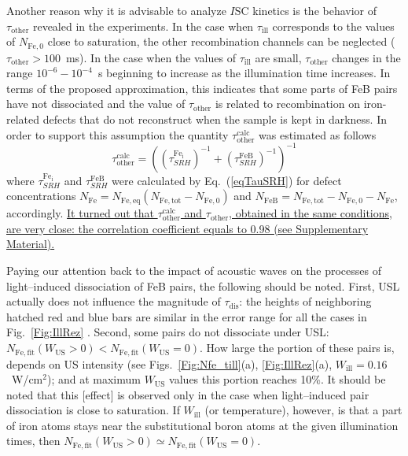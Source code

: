 \documentclass[%
 aip,jap,
 amsmath,amssymb,
 reprint,%
]{revtex4-1}
\begin{document}
Another reason why it is advisable to analyze $I\mathrm{SC}$ kinetics is the behavior of
$\tau_\mathrm{other}$ revealed in the experiments.
In the case when $\tau_\mathrm{ill}$ corresponds to the values of $N_\mathrm{Fe,0}$ close to saturation, the other recombination channels  can be neglected ($\tau_\mathrm{other}> 100$~ms).
In the case when the values of $\tau_\mathrm{ill}$ are small,
$\tau_\mathrm{other}$ changes in the range $10^{-6}-10^{-4}$~s beginning to increase as the illumination time increases.
In terms of the proposed approximation, this indicates that some parts of FeB pairs have not dissociated and the value of $\tau_\mathrm{other}$ is related
to recombination on iron-related defects that do not reconstruct when the sample is kept in darkness. In order to support this assumption the quantity
$\tau_\mathrm{other}^\mathrm{calc}$
was estimated as follows
\begin{equation*}
\tau_\mathrm{other}^\mathrm{calc}=\left(\left(\tau_{SRH}^\mathrm{Fe_i}\right)^{-1}
+\left(\tau_{SRH}^\mathrm{FeB}\right)^{-1}\right)^{-1}
\end{equation*}
where
$\tau_{SRH}^\mathrm{Fe_i}$ and $\tau_{SRH}^\mathrm{FeB}$
were calculated by Eq.~(\ref{eqTauSRH}) for defect concentrations
$N_\mathrm{Fe}=N_\mathrm{Fe,eq}(N_\mathrm{Fe,tot}-N_\mathrm{Fe,0})$
and $N_\mathrm{FeB}= N_\mathrm{Fe,tot}-N_\mathrm{Fe,0}- N_\mathrm{Fe}$, accordingly.
 \textcolor[rgb]{0.00,0.07,1.00}{\uline{
It turned out that $\tau_\mathrm{other}^\mathrm{calc}$ and
$\tau_\mathrm{other}$, obtained in the same conditions, are very close:
the correlation coefficient equals to 0.98 (see Supplementary Material).
}}

Paying our attention back to the impact of acoustic waves on the processes of light--induced dissociation of FeB pairs, the following should be noted.
First,  USL actually does not influence the magnitude of $\tau_\mathrm{dis}$:
the heights of neighboring hatched red and blue bars are similar in the error range for all the cases in Fig.~\ref{Fig:IllRez} .
Second, some pairs do not dissociate under USL:
$N_\mathrm{Fe,fit}(W_\mathrm{US}>0)< N_\mathrm{Fe,fit}(W_\mathrm{US}=0)$.
How large the portion of these pairs is, depends on US intensity
(see Figs.~\ref{Fig:Nfe_till}(a), \ref{Fig:IllRez}(a), $W_\mathrm{ill}=0.16$~W/cm$^2$);
and at maximum $W_\mathrm{US}$ values this portion reaches 10\%.
It should be noted that this [effect] is observed only in the case when light--induced pair dissociation is close to saturation.
If $W_\mathrm{ill}$ (or temperature), however, is that a part of iron atoms stays near the substitutional boron atoms at the given illumination times,
then $N_\mathrm{Fe,fit}(W_\mathrm{US}>0)\simeq N_\mathrm{Fe,fit}(W_\mathrm{US}=0)$.
\end{document}

